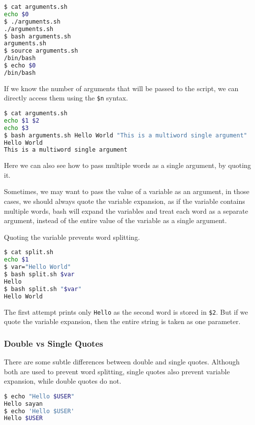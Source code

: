 \begin{lstlisting}[language=bash]
$ cat arguments.sh
echo $0
$ ./arguments.sh
./arguments.sh
$ bash arguments.sh
arguments.sh
$ source arguments.sh
/bin/bash
$ echo $0
/bin/bash
\end{lstlisting}

If we know the number of arguments that will be passed to the script, we can directly access them using the \lstinline{$n} syntax.

\begin{lstlisting}[language=bash]
$ cat arguments.sh
echo $1 $2
echo $3
$ bash arguments.sh Hello World "This is a multiword single argument"
Hello World
This is a multiword single argument
\end{lstlisting}

Here we can also see how to pass multiple words as a single argument, by quoting it.

Sometimes, we may want to pass the value of a variable as an argument, in those cases, we should always quote the variable expansion, as if the variable contains multiple words, bash will expand the variables and treat each word as a separate argument, instead of the entire value of the variable as a single argument.

Quoting the variable prevents word splitting.

\begin{lstlisting}[language=bash]
$ cat split.sh
echo $1
$ var="Hello World"
$ bash split.sh $var
Hello
$ bash split.sh "$var"
Hello World
\end{lstlisting}

The first attempt prints only \lstinline{Hello} as the second word is stored in \lstinline{$2}. But if we quote the variable expansion, then the entire string is taken as one parameter.

\subsubsection{Double vs Single Quotes}

There are some subtle differences between double and single quotes.
Although both are used to prevent word splitting, single quotes also prevent variable expansion, while double quotes do not.

\begin{lstlisting}[language=bash]
$ echo "Hello $USER"
Hello sayan
$ echo 'Hello $USER'
Hello $USER
\end{lstlisting}

